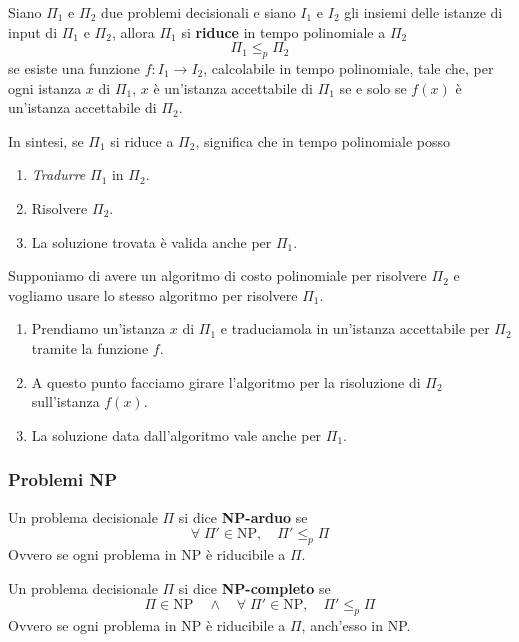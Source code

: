 \begin{theorem}
	Siano $\Pi_1$ e $\Pi_2$ due problemi decisionali e siano $I_1$ e $I_2$ gli insiemi delle istanze di input di
	$\Pi_1$ e $\Pi_2$, allora $\Pi_1$ si \textbf{riduce} in tempo polinomiale a $\Pi_2$
	\[ \Pi_1 \leq_p \Pi_2 \]
	se esiste una funzione $f : I_1 \rightarrow I_2$, calcolabile in tempo polinomiale, tale che, per ogni istanza $x$
	di $\Pi_1$, $x$ \`e un'istanza accettabile di $\Pi_1$ se e solo se $f(x)$ \`e un'istanza accettabile di $\Pi_2$.
\end{theorem}

In sintesi, se $\Pi_1$ si riduce a $\Pi_2$, significa che in tempo polinomiale posso
\begin{enumerate}
	\item \emph{Tradurre} $\Pi_1$ in $\Pi_2$.
	\item Risolvere $\Pi_2$.
	\item La soluzione trovata \`e valida anche per $\Pi_1$.
\end{enumerate}

Supponiamo di avere un algoritmo di costo polinomiale per risolvere $\Pi_2$ e vogliamo usare lo stesso algoritmo per
risolvere $\Pi_1$.
\begin{enumerate}
	\item Prendiamo un'istanza $x$ di $\Pi_1$ e traduciamola in un'istanza accettabile per $\Pi_2$ tramite la funzione
	      $f$.
	\item A questo punto facciamo girare l'algoritmo per la risoluzione di $\Pi_2$ sull'istanza $f(x)$.
	\item La soluzione data dall'algoritmo vale anche per $\Pi_1$.
\end{enumerate}

\subsubsection{Problemi NP}

\begin{definition}
	Un problema decisionale $\Pi$ si dice \textbf{NP-arduo} se
	\[	\forall \; \Pi' \in \text{NP}, \quad \Pi' \leq_p \Pi \]
	Ovvero se ogni problema in NP \`e riducibile a $\Pi$.
\end{definition}

\begin{definition}
	Un problema decisionale $\Pi$ si dice \textbf{NP-completo} se
	\[ \Pi \in \text{NP} \quad \wedge \quad \forall \; \Pi' \in \text{NP}, \quad \Pi' \leq_p \Pi \]
	Ovvero se ogni problema in NP \`e riducibile a $\Pi$, anch'esso in NP.
\end{definition}

